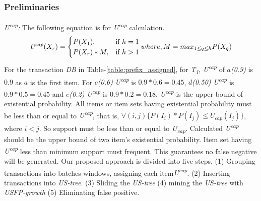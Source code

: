 \documentclass[conference]{IEEEtran}
\begin{document}
\subsubsection{Preliminaries}
\emph{U\textsuperscript{cap}:}
    The following equation is for \emph{U\textsuperscript{cap}} calculation.
	{\footnotesize
    \begin{equation}\label{equation:cap}
	\text{\emph{U\textsuperscript{cap}}}(X_r) =\begin{cases}
				P(X_1), & \text{if $ h = 1$}\\
				P(X_r)*M, & \text{if $ h > 1$}         
		\end{cases}
where,\\ M=max_{1\leq q\leq h}P(X_q)
\end{equation}}
For the transaction \emph{DB} in Table-\ref{table:prefix_assigned}, for \emph{T\textsubscript{1}}, \emph{U\textsuperscript{cap}} of \emph{$a$(0.9)} is $0.9$ as $a$ is the first item. For \emph{$c$(0.6)} \emph{U\textsuperscript{cap}} is $0.9*0.6=0.45$, \emph{$d$(0.50)} \emph{U\textsuperscript{cap}} is $0.9*0.5=0.45$ and \emph{$e$(0.2)} \emph{U\textsuperscript{cap}} is $0.9*0.2=0.18$. \emph{U\textsuperscript{cap}} is the upper bound of existential probability. All items or item sets having existential probability must be less than or equal to \emph{U\textsuperscript{cap}}, that is, $\forall(i,j)\{ P(I_i)*P(I_j)\leq U_{cap}(I_j)\}$, where $i < j$. So support must be less than or equal to \emph{U\textsubscript{cap}}. Calculated \emph{U\textsuperscript{cap}} should be the upper bound of two item's existential probability. Item set having \emph{U\textsuperscript{cap}} less than minimum support must frequent. This guarantees no false negative will be generated. Our proposed approach is divided into five steps. (1) Grouping transactions into batches-windows, assigning each item\emph{U\textsuperscript{cap}}. (2) Inserting transactions into \emph {US-tree}. (3) Sliding the \emph {US-tree} (4) mining the \emph {US-tree} with \emph{USFP-growth} (5) Eliminating false positive.
\end{document}

